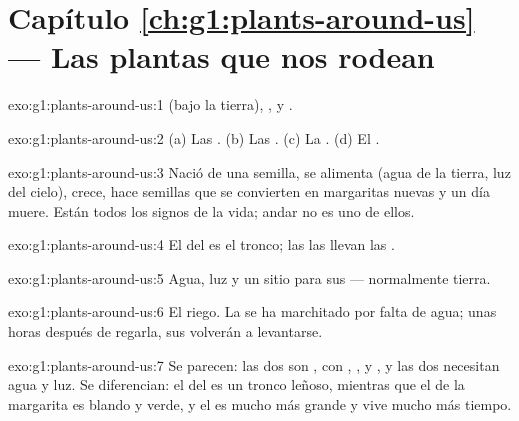 \section*{Capítulo \ref{ch:g1:plants-around-us} --- Las plantas que nos rodean}

\begin{solution}{exo:g1:plants-around-us:1}
 (bajo la tierra), ,  y .
\end{solution}

\begin{solution}{exo:g1:plants-around-us:2}
(a) Las . (b) Las . (c) La . (d) El .
\end{solution}

\begin{solution}{exo:g1:plants-around-us:3}
Nació de una semilla, se alimenta (agua de la tierra, luz del cielo),
crece, hace semillas que se convierten en margaritas nuevas y un día
muere. Están todos los signos de la vida; andar no es uno de ellos.
\end{solution}

\begin{solution}{exo:g1:plants-around-us:4}
El  del  es el tronco; las  las llevan las .
\end{solution}

\begin{solution}{exo:g1:plants-around-us:5}
Agua, luz y un sitio para sus  --- normalmente tierra.
\end{solution}

\begin{solution}{exo:g1:plants-around-us:6}
El riego. La  se ha marchitado por falta de agua; unas horas
después de regarla, sus  volverán a levantarse.
\end{solution}

\begin{solution}{exo:g1:plants-around-us:7}
Se parecen: las dos son , con , ,  y , y
las dos necesitan agua y luz. Se diferencian: el  del  es un
tronco leñoso, mientras que el de la margarita es blando y verde, y el
 es mucho más grande y vive mucho más tiempo.
\end{solution}

